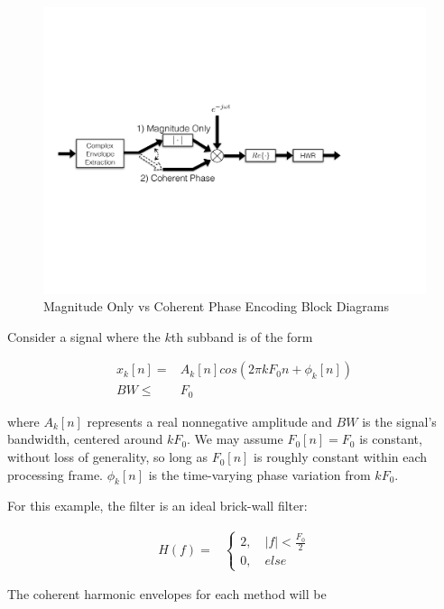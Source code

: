 \documentclass [11pt, proquest,oneside] {ganter_thesis}[2015/03/03]
\begin{document}
\begin{figure}[!ht]
  \centering
    \includegraphics[width=1\textwidth]{coherent_phase}   
    \caption{Magnitude Only vs Coherent Phase Encoding Block Diagrams}
    \label{fig:coherent_angle}
\end{figure}

Consider a signal where the $k$th subband is of the form

\begin{align}
x_k[n] =& A_k[n]cos(2\pi kF_0n + \phi_k[n]) \\
BW \leq& F_0 \nonumber
\end{align}

where $A_k[n]$ represents a real nonnegative amplitude and $BW$ is the signal's bandwidth, centered around $kF_0$.  We may assume $F_0[n] = F_0$ is constant, without loss of generality, so long as $F_0[n]$ is roughly constant within each processing frame.  $\phi_k[n]$ is the time-varying phase variation from $kF_0$.

For this example, the filter is an ideal brick-wall filter:

\begin{align}
H(f) =& \left\{
                \begin{array}{ll}
                2, \quad |f| < \frac{F_0}{2} \\
			   0, \quad else \nonumber
                \end{array}
              \right.
\end{align}

The coherent harmonic envelopes for each method will be
\end{document}
